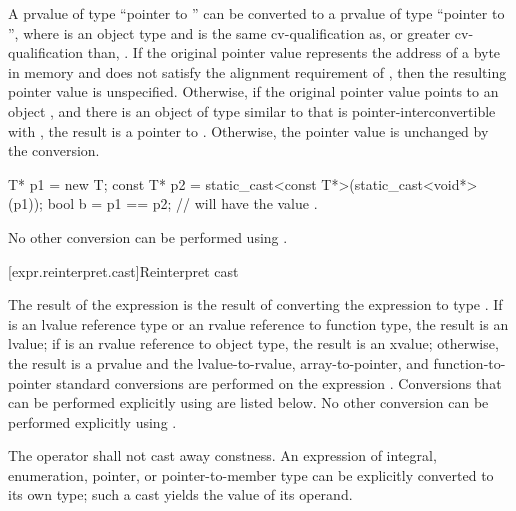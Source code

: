 \pnum
A prvalue of type ``pointer to  '' can be
converted to a prvalue of type ``pointer to  '',
where  is an object type and  is the same
cv-qualification as, or greater cv-qualification than, .
If the original pointer value represents the address
 of a byte in memory and
 does not satisfy the alignment requirement of ,
then the resulting pointer value is unspecified.
Otherwise, if the original pointer value points to an object ,
and there is an object  of type similar to 
that is pointer-interconvertible with ,
the result is a pointer to .
Otherwise, the pointer value is unchanged by the conversion.
\begin{example}
\begin{codeblock}
T* p1 = new T;
const T* p2 = static_cast<const T*>(static_cast<void*>(p1));
bool b = p1 == p2;  //  will have the value .
\end{codeblock}
\end{example}

\pnum
No other conversion can be performed using .

[expr.reinterpret.cast]{Reinterpret cast}

\pnum
{}%
%
The result of the expression  is the
result of converting the expression  to type .
%
%
If  is an lvalue reference type or an rvalue reference to function type, the result is an lvalue;
if  is an rvalue reference to object type, the result is an xvalue;
otherwise, the result is a prvalue and the
lvalue-to-rvalue, array-to-pointer,
and function-to-pointer standard conversions are
performed on the expression . Conversions that can be performed explicitly
using  are listed below. No other conversion can
be performed explicitly using .

\pnum
The  operator shall not cast away constness.
An expression of integral, enumeration, pointer, or pointer-to-member type
can be explicitly converted to its own type; such a cast yields the value of
its operand.

